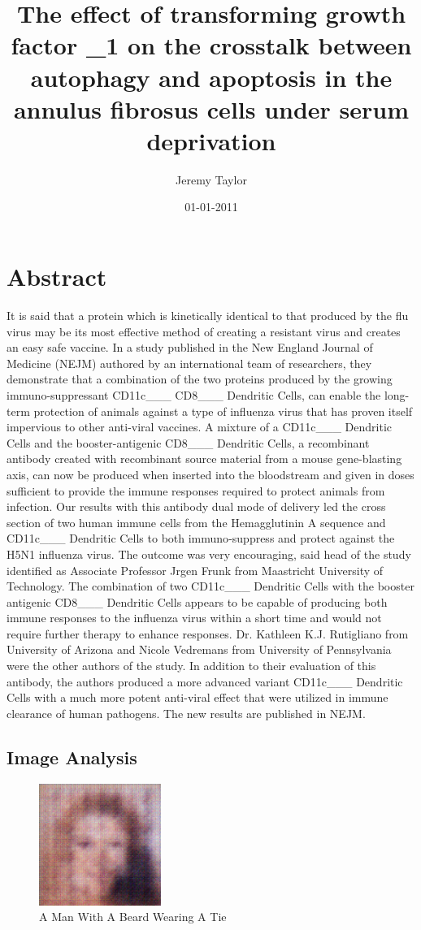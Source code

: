 \documentclass{article}%
\title{The effect of transforming growth factor \_1 on the crosstalk between autophagy and apoptosis in the annulus fibrosus cells under serum deprivation}%
\author{Jeremy Taylor}%
\affil{Stem Cell and Tissue Engineering Department, Research Center for Science and Technology in Medicine (RCSTiM), Tehran University of Medical Sciences, Tehran, Iran}%
\date{01{-}01{-}2011}%
\begin{document}
%
\normalsize%
\maketitle%
\section{Abstract}%
\label{sec:Abstract}%
It is said that a protein which is kinetically identical to that produced by the flu virus may be its most effective method of creating a resistant virus and creates an easy safe vaccine.\newline%
In a study published in the New England Journal of Medicine (NEJM) authored by an international team of researchers, they demonstrate that a combination of the two proteins produced by the growing immuno{-}suppressant CD11c\_\_\_ CD8\_\_\_ Dendritic Cells, can enable the long{-}term protection of animals against a type of influenza virus that has proven itself impervious to other anti{-}viral vaccines.\newline%
A mixture of a CD11c\_\_\_ Dendritic Cells and the booster{-}antigenic CD8\_\_\_ Dendritic Cells, a recombinant antibody created with recombinant source material from a mouse gene{-}blasting axis, can now be produced when inserted into the bloodstream and given in doses sufficient to provide the immune responses required to protect animals from infection.\newline%
Our results with this antibody dual mode of delivery led the cross section of two human immune cells from the Hemagglutinin A sequence and CD11c\_\_\_ Dendritic Cells to both immuno{-}suppress and protect against the H5N1 influenza virus. The outcome was very encouraging, said head of the study identified as Associate Professor Jrgen Frunk from Maastricht University of Technology. The combination of two CD11c\_\_\_ Dendritic Cells with the booster antigenic CD8\_\_\_ Dendritic Cells appears to be capable of producing both immune responses to the influenza virus within a short time and would not require further therapy to enhance responses.\newline%
Dr. Kathleen K.J. Rutigliano from University of Arizona and Nicole Vedremans from University of Pennsylvania were the other authors of the study. In addition to their evaluation of this antibody, the authors produced a more advanced variant CD11c\_\_\_ Dendritic Cells with a much more potent anti{-}viral effect that were utilized in immune clearance of human pathogens.\newline%
The new results are published in NEJM.

%
\subsection{Image Analysis}%
\label{subsec:ImageAnalysis}%


\begin{figure}[h!]%
\centering%
\includegraphics[width=150px]{500_fake_images/samples_5_93.png}%
\caption{A Man With A Beard Wearing A Tie}%
\end{figure}

%
\end{document}
